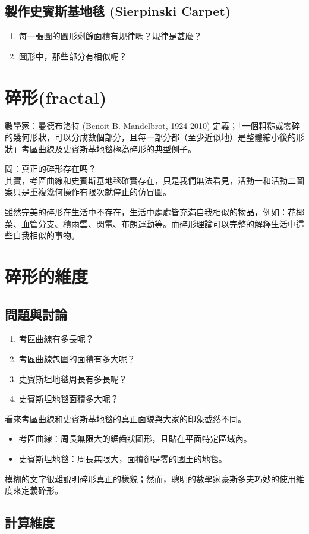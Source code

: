 \subsection{製作史賓斯基地毯 (Sierpinski Carpet)}
\vfill
\begin{enumerate}
\item 每一張圖的圖形剩餘面積有規律嗎？規律是甚麼？
\item 圖形中，那些部分有相似呢？
\end{enumerate}
\section{碎形(fractal)}
數學家：曼德布洛特 (Benoit B. Mandelbrot, 1924-2010)
定義；「一個粗糙或零碎的幾何形狀，可以分成數個部分，且每一部分都（至少近似地）是整體縮小後的形狀」考區曲線及史賓斯基地毯極為碎形的典型例子。

問：真正的碎形存在嗎？\\
其實，考區曲線和史賓斯基地毯確實存在，只是我們無法看見，活動一和活動二圖案只是重複幾何操作有限次就停止的仿冒圖。

雖然完美的碎形在生活中不存在，生活中處處皆充滿自我相似的物品，例如：花椰菜、血管分支、積雨雲、閃電、布朗運動等。而碎形理論可以完整的解釋生活中這些自我相似的事物。
\section{碎形的維度}
\subsection{問題與討論}
\begin{enumerate}
\item 考區曲線有多長呢？
\item 考區曲線包圍的面積有多大呢？
\item 史賓斯坦地毯周長有多長呢？
\item 史賓斯坦地毯面積多大呢？
\end{enumerate}
看來考區曲線和史賓斯基地毯的真正面貌與大家的印象截然不同。

\begin{itemize}
\item 考區曲線：周長無限大的鋸齒狀圖形，且貼在平面特定區域內。
\item 史賓斯坦地毯：周長無限大，面積卻是零的國王的地毯。
\end{itemize}

模糊的文字很難說明碎形真正的樣貌；然而，聰明的數學家豪斯多夫巧妙的使用維度來定義碎形。
\subsection{計算維度}
